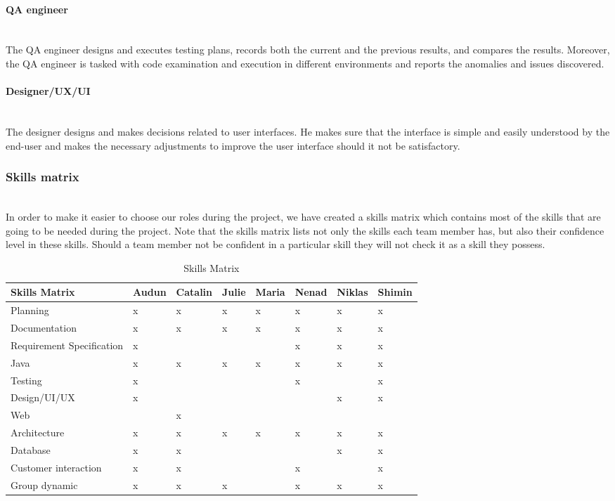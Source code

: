 \documentclass[../document.tex]{subfiles}
\begin{document}
\paragraph{QA engineer} \ \\
The QA engineer designs and executes testing plans, records both the current and the previous results, and compares the results. Moreover, the QA engineer is tasked with code examination and execution in different environments and reports the anomalies and issues discovered. 

\paragraph{Designer/UX/UI} \ \\
The designer designs and makes decisions related to user interfaces. He makes sure that the interface is simple and easily understood by the end-user and makes the necessary adjustments to improve the user interface should it not be satisfactory.

\subsubsection{Skills matrix} \ \\
In order to make it easier to choose our roles during the project, we have created a skills matrix which contains most of the skills that are going to be needed during the project. Note that the skills matrix lists not only the skills each team member has, but also their confidence level in these skills. Should a team member not be confident in a particular skill they will not check it as a skill they possess.

\begin{table}[H]
\caption{Skills Matrix}
\begin{tabularx}{\textwidth}{|X|l|l|l|l|l|l|l|}
\hline
Skills Matrix
&Audun
&Catalin
&Julie
&Maria
&Nenad
&Niklas
&Shimin
\\ \hline Planning
&x
&x
&x
&x
&x
&x
&x
\\ \hline Documentation
&x
&x
&x
&x
&x
&x
&x
\\ \hline Requirement Specification
&x
&
&
&
&x
&x
&x
\\ \hline Java
&x
&x
&x
&x
&x
&x
&x
\\ \hline Testing
&x
&
&
&
&x
&
&x
\\ \hline Design/UI/UX
&x
&
&
&
&
&x
&x
\\ \hline Web
&
&x
&
&
&
&
&
\\ \hline Architecture
&x
&x
&x
&x
&x
&x
&x
\\ \hline Database
&x
&x
&
&
&
&x
&x
\\ \hline Customer interaction
&x
&x
&
&
&x
&
&x
\\ \hline Group dynamic
&x
&x
&x
&
&x
&x
&x
\\ \hline
\end{tabularx}
\end{table}
\end{document}

